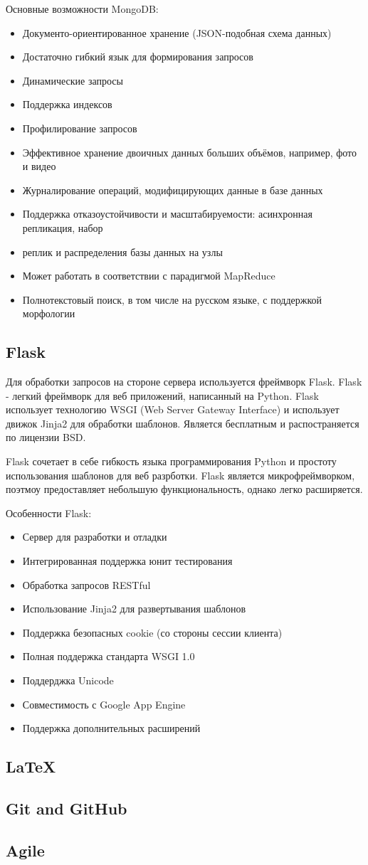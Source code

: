 Основные возможности MongoDB:
\begin{itemize}
    \item Документо-ориентированное хранение (JSON-подобная схема данных)
    \item Достаточно гибкий язык для формирования запросов
    \item Динамические запросы
    \item Поддержка индексов
    \item Профилирование запросов
    \item Эффективное хранение двоичных данных больших объёмов, например, фото и видео
    \item Журналирование операций, модифицирующих данные в базе данных
    \item Поддержка отказоустойчивости и масштабируемости: асинхронная репликация, набор \item реплик и распределения базы данных на узлы
    \item Может работать в соответствии с парадигмой MapReduce
    \item Полнотекстовый поиск, в том числе на русском языке, с поддержкой морфологии
\end{itemize}

\subsection{Flask}
Для обработки запросов на стороне сервера используется фреймворк Flask.
Flask - легкий фреймворк для веб приложений, написанный на Python. Flask использует технологию WSGI (Web Server Gateway Interface) и использует движок Jinja2 для обработки шаблонов. Является бесплатным и распостраняется по лицензии BSD.\par
Flask сочетает в себе гибкость языка программирования Python и простоту использования шаблонов для веб разрботки. Flask является микрофреймворком, поэтмоу предоставляет небольшую функциональность, однако легко расширяется.\par

Особенности Flask:
\begin{itemize}
    \item Сервер для разработки и отладки
    \item Интегрированная поддержка юнит тестирования
    \item Обработка запросов RESTful
    \item Использование Jinja2 для развертывания шаблонов
    \item Поддержка безопасных cookie (со стороны сессии клиента)
    \item Полная поддержка стандарта WSGI 1.0
    \item Поддерджка Unicode
    \item Совместимость с Google App Engine
    \item Поддержка дополнительных расширений
\end{itemize}

\subsection{LaTeX}
\subsection{Git and GitHub}
\subsection{Agile}

\newpage
